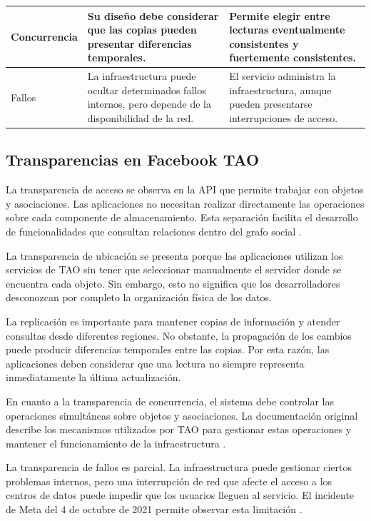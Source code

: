 \documentclass[12pt,a4paper]{article}
\begin{document}
\begin{table}[H]
\begin{tabular}{p{2.4cm}p{5.6cm}p{5.6cm}}
\midrule

Concurrencia &
Su diseño debe considerar que las copias pueden presentar diferencias temporales. &
Permite elegir entre lecturas eventualmente consistentes y fuertemente consistentes. \\

\midrule

Fallos &
La infraestructura puede ocultar determinados fallos internos, pero depende de la disponibilidad de la red. &
El servicio administra la infraestructura, aunque pueden presentarse interrupciones de acceso. \\

\bottomrule
\end{tabular}
\end{table}

\subsection{Transparencias en Facebook TAO}

La transparencia de acceso se observa en la API que permite trabajar con objetos y asociaciones. Las aplicaciones no necesitan realizar directamente las operaciones sobre cada componente de almacenamiento. Esta separación facilita el desarrollo de funcionalidades que consultan relaciones dentro del grafo social \cite{bronson2013tao}.

La transparencia de ubicación se presenta porque las aplicaciones utilizan los servicios de TAO sin tener que seleccionar manualmente el servidor donde se encuentra cada objeto. Sin embargo, esto no significa que los desarrolladores desconozcan por completo la organización física de los datos.

La replicación es importante para mantener copias de información y atender consultas desde diferentes regiones. No obstante, la propagación de los cambios puede producir diferencias temporales entre las copias. Por esta razón, las aplicaciones deben considerar que una lectura no siempre representa inmediatamente la última actualización.

En cuanto a la transparencia de concurrencia, el sistema debe controlar las operaciones simultáneas sobre objetos y asociaciones. La documentación original describe los mecanismos utilizados por TAO para gestionar estas operaciones y mantener el funcionamiento de la infraestructura \cite{bronson2013tao}.

La transparencia de fallos es parcial. La infraestructura puede gestionar ciertos problemas internos, pero una interrupción de red que afecte el acceso a los centros de datos puede impedir que los usuarios lleguen al servicio. El incidente de Meta del 4 de octubre de 2021 permite observar esta limitación \cite{meta2021outage}.
\end{document}
